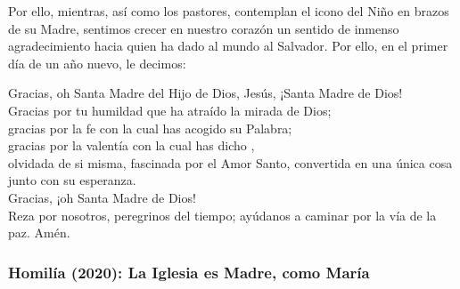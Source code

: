 \begin{body}
	Por ello, mientras, así como los pastores, contemplan el icono del Niño en brazos de su Madre, sentimos crecer en nuestro corazón un sentido de inmenso agradecimiento hacia quien ha dado al mundo al Salvador. Por ello, en el primer día de un año nuevo, le decimos:
	
	Gracias, oh Santa Madre del Hijo de Dios, Jesús, ¡Santa Madre de Dios!\\ Gracias por tu humildad que ha atraído la mirada de Dios;\\ gracias por la fe con la cual has acogido su Palabra;\\ gracias por la valentía con la cual has dicho ,\\ olvidada de si misma, fascinada por el Amor Santo, convertida en una única cosa junto con su esperanza.\\ Gracias, ¡oh Santa Madre de Dios!\\ Reza por nosotros, peregrinos del tiempo; ayúdanos a caminar por la vía de la paz. Amén.
\end{body}

\subsubsection{Homilía (2020): La Iglesia es Madre, como María}



